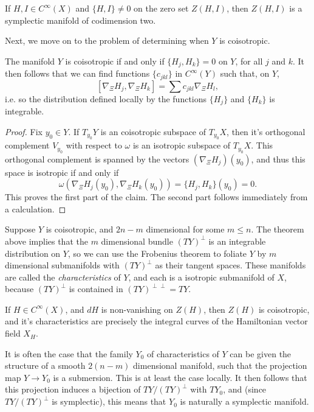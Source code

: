 \begin{example}
    If $H,I \in C^\infty(X)$ and $\{ H, I \} \neq 0$ on the zero set $Z(H,I)$, then $Z(H,I)$ is a symplectic manifold of codimension two.
\end{example}

Next, we move on to the problem of determining when $Y$ is coisotropic.

\begin{theorem}
    The manifold $Y$ is coisotropic if and only if $\{ H_j, H_k \} = 0$ on $Y$, for all $j$ and $k$. It then follows that we can find functions $\{ c_{jkl} \}$ in $C^\infty(Y)$ such that, on $Y$,
    \[ [ \nabla_\Xi H_j, \nabla_\Xi H_k ] = \sum c_{jkl} \nabla_\Xi H_l, \]
    i.e. so the distribution defined locally by the functions $\{ H_j \}$ and $\{ H_k \}$ is integrable.
\end{theorem}
\begin{proof}
    Fix $y_0 \in Y$. If $T_{y_0} Y$ is an coisotropic subspace of $T_{y_0} X$, then it's orthogonal complement $V_{y_0}$ with respect to $\omega$ is an isotropic subspace of $T_{y_0} X$. This orthogonal complement is spanned by the vectors $(\nabla_\Xi H_j)(y_0)$, and thus this space is isotropic if and only if
    \[ \omega(\nabla_\Xi H_j(y_0), \nabla_\Xi H_k(y_0)) = \{ H_j, H_k \}(y_0) = 0. \]
    This proves the first part of the claim. The second part follows immediately from a calculation.
\end{proof}

Suppose $Y$ is coisotropic, and $2n - m$ dimensional for some $m \leq n$. The theorem above implies that the $m$ dimensional bundle $(TY)^\perp$ is an integrable distribution on $Y$, so we can use the Frobenius theorem to foliate $Y$ by $m$ dimensional submanifolds with $(TY)^\perp$ as their tangent spaces. These manifolds are called the \emph{characteristics} of $Y$, and each is a isotropic submanifold of $X$, because $(TY)^\perp$ is contained in $(TY)^{\perp \perp} = TY$.

\begin{example}
    If $H \in C^\infty(X)$, and $dH$ is non-vanishing on $Z(H)$, then $Z(H)$ is coisotropic, and it's characteristics are precisely the integral curves of the Hamiltonian vector field $X_H$.
\end{example}

It is often the case that the family $Y_0$ of characteristics of $Y$ can be given the structure of a smooth $2(n-m)$ dimensional manifold, such that the projection map $Y \to Y_0$ is a submersion. This is at least the case locally. It then follows that this projection induces a bijection of $TY / (TY)^\perp$ with $TY_0$, and (since $TY / (TY)^\perp$ is symplectic), this means that $Y_0$ is naturally a symplectic manifold.

